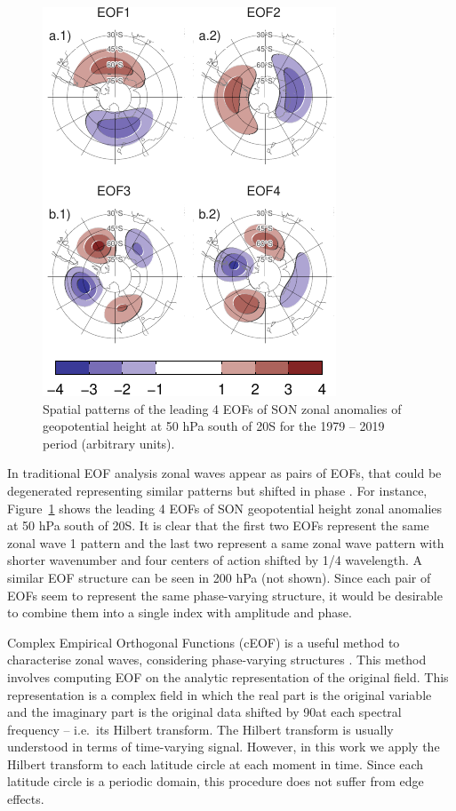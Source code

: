 \documentclass[smallextended]{svjour3}       %
\begin{document}
\begin{figure}
\centering
\includegraphics{../figures/eof-naive-1.pdf}
\caption{\label{fig:eof-naive}Spatial patterns of the leading 4 EOFs of SON zonal anomalies of geopotential height at 50 hPa south of 20\degree S for the 1979 -- 2019 period (arbitrary units).}
\end{figure}

In traditional EOF analysis zonal waves appear as pairs of EOFs, that could be degenerated representing similar patterns but shifted in phase \citep{horel1984}.
For instance, Figure~\ref{fig:eof-naive} shows the leading 4 EOFs of SON geopotential height zonal anomalies at 50 hPa south of 20\degree S.
It is clear that the first two EOFs represent the same zonal wave 1 pattern and the last two represent a same zonal wave pattern with shorter wavenumber and four centers of action shifted by 1/4 wavelength.
A similar EOF structure can be seen in 200 hPa (not shown).
Since each pair of EOFs seem to represent the same phase-varying structure, it would be desirable to combine them into a single index with amplitude and phase.

Complex Empirical Orthogonal Functions (cEOF) is a useful method to characterise zonal waves, considering phase-varying structures \citep{horel1984}.
This method involves computing EOF on the analytic representation of the original field.
This representation is a complex field in which the real part is the original variable and the imaginary part is the original data shifted by 90\degree at each spectral frequency -- i.e.~its Hilbert transform.
The Hilbert transform is usually understood in terms of time-varying signal.
However, in this work we apply the Hilbert transform to each latitude circle at each moment in time.
Since each latitude circle is a periodic domain, this procedure does not suffer from edge effects.
\end{document}
